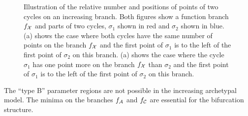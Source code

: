\begin{figure}
	\centering
	 \quad
	\caption[Illustration of the relative number and positions of points of two cycles on an increasing branch]{
		Illustration of the relative number and positions of points of two cycles on an increasing branch.
		Both figures show a function branch $f_{\mathcal{X}}$ and parts of two cycles, $\sigma_1$ shown in red and $\sigma_2$ shown in blue.
		(a) shows the case where both cycles have the same number of points on the branch $f_{\mathcal{X}}$ and the first point of $\sigma_1$ is to the left of the first point of $\sigma_2$ on this branch.
		(a) shows the case where the cycle $\sigma_1$ has one point more on the branch $f_{\mathcal{X}}$ than $\sigma_2$ and the first point of $\sigma_1$ is to the left of the first point of $\sigma_2$ on this branch.
	}
	\label{fig:add.change.increasing}
\end{figure}

\begin{theorem}
	The ``type B'' parameter regions are not possible in the increasing archetypal model.
	The minima on the branches $f_{\mathcal{A}}$ and $f_{\mathcal{C}}$ are essential for the bifurcation structure.
\end{theorem}

